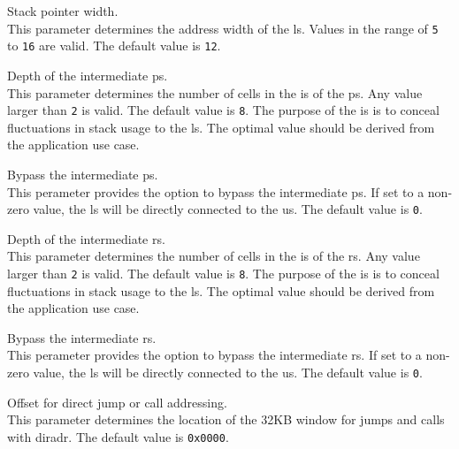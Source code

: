 \begin{description}[style=nextline]

\item[\texttt{SP\_WIDTH}] Stack pointer width. \\
  This parameter determines the address width of the \gls{ls}.
  Values in the range of \texttt{5} to \texttt{16} are valid.
  The default value is \texttt{12}. 
  
\item[\texttt{IPS\_DEPTH}] Depth of the intermediate \gls{ps}. \\
  This parameter determines the number of \glspl{cell} in the \gls{is} of the \gls{ps}.
  Any value larger than \texttt{2} is valid.
  The default value is \texttt{8}. 
  The purpose of the \gls{is} is to conceal fluctuations in stack usage to the \gls{ls}.
  The optimal value should be derived from the application use case.

\item[\texttt{IPS\_BYPASS}] Bypass the intermediate \gls{ps}. \\
  This perameter provides the option to bypass the intermediate \gls{ps}.
  If set to a non-zero value, the \gls{ls} will be directly connected to the \gls{us}.
  The default value is \texttt{0}. 

\item[\texttt{IRS\_DEPTH}] Depth of the intermediate \gls{rs}. \\
  This parameter determines the number of \glspl{cell} in the \gls{is} of the \gls{rs}.
  Any value larger than \texttt{2} is valid.
  The default value is \texttt{8}. 
  The purpose of the \gls{is} is to conceal fluctuations in stack usage to the \gls{ls}.
  The optimal value should be derived from the application use case.

\item[\texttt{IRS\_BYPASS}] Bypass the intermediate \gls{rs}. \\
  This perameter provides the option to bypass the intermediate \gls{rs}.
  If set to a non-zero value, the \gls{ls} will be directly connected to the \gls{us}.
  The default value is \texttt{0}. 

\item[\texttt{PBUS\_AADR\_OFFSET}] Offset for direct \gls{jump} or \gls{call} addressing. \\
  This parameter determines the location of the 32KB window for \glspl{jump} and \glspl{call}
  with \gls{diradr}.
  The default value is \texttt{0x0000}. 


\end{description}
